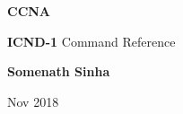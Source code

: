 \begin{titlepage}
    \begin{center}
        \vspace*{1cm}
        
        \Huge
        \textbf{CCNA}
        \vspace*{20pt}
        
        \LARGE
        \textbf{ICND-1} Command Reference
             
		\vspace{75pt}
        
		\large
        \textbf{Somenath Sinha}
        
       	\normalsize
       	Nov 2018
        
    \end{center}
\end{titlepage}